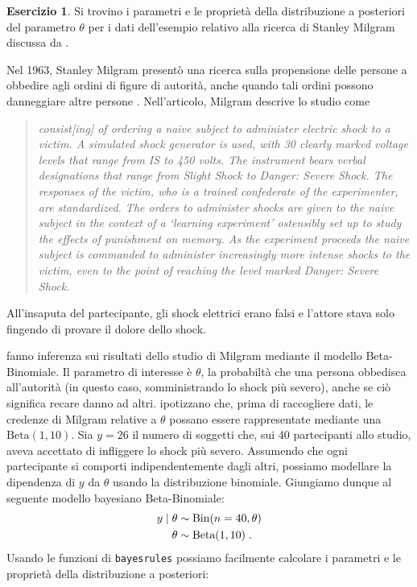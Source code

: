 \documentclass[
  10pt,
  italian,
  a4paper,
  extrafontsizes,onecolumn,openright
  ]{memoir}
\DeclareMathOperator{\Bin}{Bin} %
\theoremstyle{definition}
\theoremstyle{definition}
\theoremstyle{definition}
\newtheorem{exercise}{Esercizio}[chapter]
\theoremstyle{definition}
\theoremstyle{remark}
\begin{document}
\begin{exercise}

Si trovino i parametri e le proprietà della distribuzione a posteriori del parametro \(\theta\) per i dati dell'esempio relativo alla ricerca di Stanley Milgram discussa da \textcite{Johnson2022bayesrules}.

Nel 1963, Stanley Milgram presentò una ricerca sulla propensione delle persone a obbedire agli ordini di figure di autorità, anche quando tali ordini possono danneggiare altre persone \autocite{milgram1963behavioral}. Nell'articolo, Milgram descrive lo studio come

\begin{quote}
\emph{consist{[}ing{]} of ordering a naive subject to administer electric shock to a victim. A simulated shock generator is used, with 30 clearly marked voltage levels that range from IS to 450 volts. The instrument bears verbal designations that range from Slight Shock to Danger: Severe Shock. The responses of the victim, who is a trained confederate of the experimenter, are standardized. The orders to administer shocks are given to the naive subject in the context of a `learning experiment' ostensibly set up to study the effects of punishment on memory. As the experiment proceeds the naive subject is commanded to administer increasingly more intense shocks to the victim, even to the point of reaching the level marked Danger: Severe Shock.}
\end{quote}

\noindent
All'insaputa del partecipante, gli shock elettrici erano falsi e l'attore stava solo fingendo di provare il dolore dello shock.

\textcite{Johnson2022bayesrules} fanno inferenza sui risultati dello studio di Milgram mediante il modello Beta-Binomiale. Il parametro di interesse è \(\theta\), la probabiltà che una persona obbedisca all'autorità (in questo caso, somministrando lo shock più severo), anche se ciò significa recare danno ad altri. \textcite{Johnson2022bayesrules} ipotizzano che, prima di raccogliere dati, le credenze di Milgram relative a \(\theta\) possano essere rappresentate mediante una \(\mbox{Beta}(1, 10)\). Sia \(y = 26\) il numero di soggetti che, sui 40 partecipanti allo studio, aveva accettato di infliggere lo shock più severo. Assumendo che ogni partecipante si comporti indipendentemente dagli altri, possiamo modellare la dipendenza di \(y\) da \(\theta\) usando la distribuzione binomiale. Giungiamo dunque al seguente modello bayesiano Beta-Binomiale:
\begin{align}
y \mid \theta & \sim \Bin(n = 40, \theta) \notag\\
\theta & \sim \text{Beta}(1, 10) \; . \notag
\end{align}
Usando le funzioni di \texttt{bayesrules} possiamo facilmente calcolare i parametri e le proprietà della distribuzione a posteriori:


\end{exercise}
\end{document}
